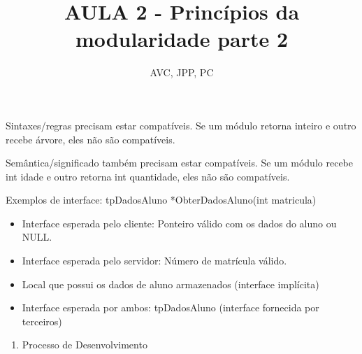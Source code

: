\documentclass[
	12pt, %
]{fphw}
\title{AULA 2 - Princípios da modularidade parte 2} %
\author{AVC, JPP, PC} %
\date{} %
\institute{Pontifícia Universidade Católica do Rio de Janeiro \\ Departamento de Informática} %
\begin{document}
\maketitle %

\begin{doublespace}

    Sintaxes/regras precisam estar compatíveis. Se um módulo retorna inteiro e outro recebe árvore, eles não são compatíveis.

    Semântica/significado também precisam estar compatíveis. Se um módulo recebe int idade e outro retorna int quantidade, eles não são compatíveis.
    
    Exemplos de interface: tpDadosAluno *ObterDadosAluno(int matricula)

    \begin{itemize}

        \item Interface esperada pelo cliente: Ponteiro válido com os dados do aluno ou NULL.

        \item Interface esperada pelo servidor: Número de matrícula válido.

        \item Local que possui os dados de aluno armazenados (interface implícita)
        
        \item Interface esperada por ambos: tpDadosAluno (interface fornecida por terceiros)

    \end{itemize}

    \pagebreak

    \begin{enumerate}

        \item Processo de Desenvolvimento
        

\end{enumerate}
\end{doublespace}
\end{document}

